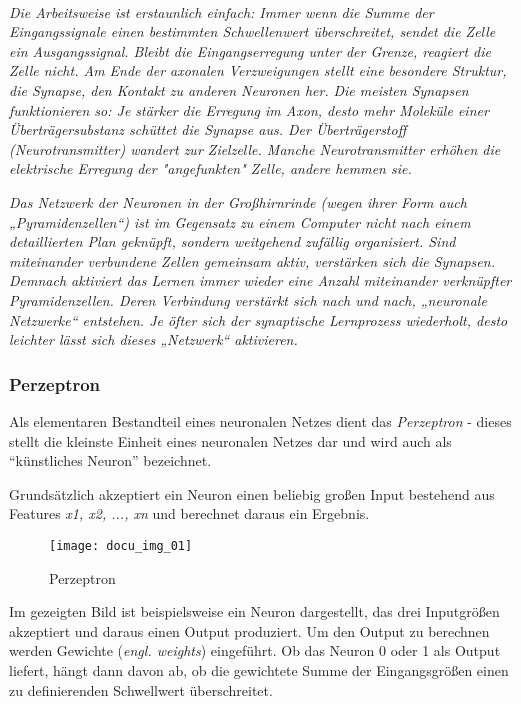 \paragraph{}
\textit{Die Arbeitsweise ist erstaunlich einfach: Immer wenn die Summe der Eingangssignale einen bestimmten Schwellenwert überschreitet, sendet die Zelle ein Ausgangssignal. Bleibt die Eingangserregung unter der Grenze, reagiert die Zelle nicht. Am Ende der axonalen Verzweigungen stellt eine besondere Struktur, die Synapse, den Kontakt zu anderen Neuronen her.}
\textit{Die meisten Synapsen funktionieren so: Je stärker die Erregung im Axon, desto mehr Moleküle einer Überträgersubstanz schüttet die Synapse aus. Der Überträgerstoff (Neurotransmitter) wandert zur Zielzelle. Manche Neurotransmitter erhöhen die elektrische Erregung der "angefunkten" Zelle, andere hemmen sie.}

\textit{Das Netzwerk der Neuronen in der Großhirnrinde (wegen ihrer Form auch „Pyramidenzellen“) ist im Gegensatz zu einem Computer nicht nach einem detaillierten Plan geknüpft, sondern weitgehend zufällig organisiert. Sind miteinander verbundene Zellen gemeinsam aktiv, verstärken sich die Synapsen. Demnach aktiviert das Lernen immer wieder eine Anzahl miteinander verknüpfter Pyramidenzellen. Deren Verbindung verstärkt sich nach und nach, „neuronale Netzwerke“ entstehen. Je öfter sich der synaptische Lernprozess wiederholt, desto leichter lässt sich dieses „Netzwerk“ aktivieren.}

\subsubsection{Perzeptron}

Als elementaren Bestandteil eines neuronalen Netzes dient das \textit{Perzeptron} - dieses stellt die kleinste Einheit eines neuronalen Netzes dar und wird auch als ``künstliches Neuron'' bezeichnet.

Grundsätzlich akzeptiert ein Neuron einen beliebig großen Input bestehend aus Features \textit{x1, x2, ..., xn} und berechnet daraus ein Ergebnis.

\begin{figure}[H]
    \centering
    \texttt{[image: docu\_img\_01]}
    \caption{Perzeptron}
    \label{fig:perzeptron}
\end{figure}

Im gezeigten Bild ist beispielsweise ein Neuron dargestellt, das drei Inputgrößen akzeptiert und daraus einen Output produziert. Um den Output zu berechnen werden Gewichte (\textit{engl. weights}) eingeführt. Ob das Neuron 0 oder 1 als Output liefert, hängt dann davon ab, ob die gewichtete Summe der Eingangsgrößen einen zu definierenden Schwellwert überschreitet.

